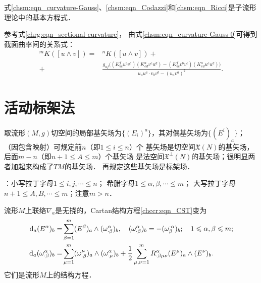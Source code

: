 式\eqref{chsm:eqn_curvature-Gauss}、\eqref{chsm:eqn_Codazzi}和\eqref{chsm:eqn_Ricci}是子流形理论中的基本方程式．


参考式\eqref{chrg:eqn_sectional-curvature}，
由式\eqref{chsm:eqn_curvature-Gauss-0}可得到截面曲率间的关系式：
\begin{equation}    \label{chsm:eqn_NM-sect-curv}
	\begin{aligned}
      {}^m K([u\wedge v]) =& {}^n K([u\wedge v]) + \\
    +& \frac{{g}_{af} \bigl( 
    (K^f_{bc} u^b v^c) (K^a_{ed} v^e u^d)
    -(K^f_{bc} v^b v^c) (K^a_{ed} u^e u^d)     \bigr)}
    {{u}_a{u}^a \cdot {v}_b{v}^b - ({u}_a{v}^a)^2 }  .
	\end{aligned}
\end{equation}  %



\section{活动标架法}\label{chsm:sec_Frame}

取流形$({M},{g})$切空间的局部基矢场为$\{(E_i)^a\}$，其对偶基矢场为$\{(E^i)_a\}$；
（因包含映射）可规定前$n$（即$1\leqslant i \leqslant n$）个
基矢场是切空间$\mathfrak{X}(N)$的基矢场，
后面$m-n$（即$n+1\leqslant A \leqslant {m}$）个基矢场
是法空间$\mathfrak{X}^\bot (N)$的基矢场；很明显两者加起来构成了$TM$的基矢场．
再规定这些基矢场是标架场．

：小写拉丁字母$1 \leqslant i,j,\cdots \leqslant n$；
希腊字母$1 \leqslant \alpha,\beta,\cdots \leqslant m$；
大写拉丁字母$n+1 \leqslant A,B,\cdots \leqslant m$；注意$m>n$．


流形$M$上联络$\nabla_a$是无挠的，Cartan结构方程\eqref{chccr:eqn_CST}变为
\begin{subequations}\label{chsm:eqn_CST-M}
    \begin{align}
        {\rm d}_a (E^\alpha)_b =&\sum_{\beta=1}^{m}(E^\beta)_a \wedge (\omega _{\cdot \beta}^\alpha)_b ,
        \quad (\omega _{\cdot \beta}^\alpha)_b =-(\omega ^{\cdot \alpha}_{ \beta})_b ;
        \quad 1 \leqslant \alpha,\beta \leqslant m; \label{chsm:eqn_CST-M-I}\\
        {\rm d}_a ( \omega _{\cdot \beta} ^\alpha  )_b  =& \sum_{\mu=1}^{m} ( \omega _{\cdot \beta}^\mu )_a
        \wedge ( \omega _{\cdot \mu}^\alpha )_b + \frac{1}{2}\sum_{\mu,\nu=1}^{m}R_{\cdot \beta\mu\nu}^\alpha
        (E^\mu)_a \wedge (E^\nu)_b. \label{chsm:eqn_CST-M-II} %
    \end{align}
\end{subequations}
它们是流形$M$上的结构方程．


